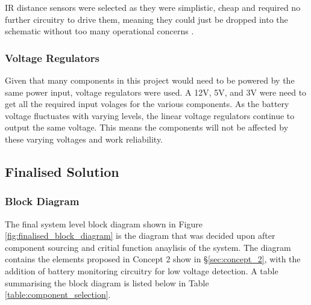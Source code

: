 \documentclass [11pt]{article}
\begin{document}
IR distance sensors were selected as they were simplistic, cheap and required no further circuitry to drive them, meaning they could just be dropped into the schematic without too many operational concerns \cite{IR_distance_sensor}. 

\subsubsection{Voltage Regulators}

Given that many components in this project would need to be powered by the same power input, voltage regulators were used. A 12V, 5V, and 3V were need to get all the required input volages for the various components. As the battery voltage fluctuates with varying levels, the linear voltage regulators continue to output the same voltage. This means the components will not be affected by these varying voltages and work reliability.

\subsection{Finalised Solution}

\subsubsection{Block Diagram}

The final system level block diagram shown in Figure \ref{fig:finalised_block_diagram} is the diagram that was decided upon after component sourcing and critial function anaylisis of the system. The diagram contains the elements proposed in Concept 2 show in §\ref{sec:concept_2}, with the addition of battery monitoring circuitry for low voltage detection. A table summarising the block diagram is listed below in Table \ref{table:component_selection}.
\end{document}
